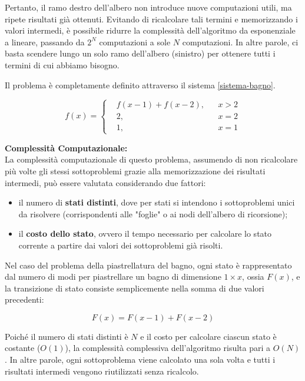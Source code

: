 Pertanto, il ramo destro dell’albero non introduce nuove computazioni utili, ma ripete risultati già ottenuti.  
Evitando di ricalcolare tali termini e memorizzando i valori intermedi, è possibile ridurre la complessità dell’algoritmo da esponenziale a lineare, passando da $2^N$ computazioni a sole $N$ computazioni.
In altre parole, ci basta scendere lungo un solo ramo dell'albero (sinistro) per ottenere tutti i termini di cui abbiamo bisogno.

Il problema è completamente definito attraverso il sistema \eqref{sistema-bagno}.

\begin{equation}
	f(x) =
	\left\{
	\begin{aligned}
		& f(x-1) + f(x-2), && x > 2\\
		& 2, && x = 2\\
		& 1, && x = 1
	\end{aligned}
	\right.
	\label{sistema-bagno}
\end{equation}



\noindent \textbf{Complessità Computazionale:} \\
La complessità computazionale di questo problema, assumendo di non ricalcolare più volte gli stessi sottoproblemi grazie alla memorizzazione dei risultati intermedi, può essere valutata considerando due fattori:


\begin{itemize}
	\item il numero di \textbf{stati distinti}, dove per stati si intendono i sottoproblemi unici da risolvere (corrispondenti alle "foglie" o ai nodi dell'albero di ricorsione);
	\item il \textbf{costo dello stato}, ovvero il tempo necessario per calcolare lo stato corrente a partire dai valori dei sottoproblemi già risolti.
\end{itemize}

Nel caso del problema della piastrellatura del bagno, ogni stato è rappresentato dal numero di modi per piastrellare un bagno di dimensione \(1 \times x\), ossia \(F(x)\), e la transizione di stato consiste semplicemente nella somma di due valori precedenti:

\[
F(x) = F(x-1) + F(x-2)
\]

Poiché il numero di stati distinti è \(N\) e il costo per calcolare ciascun stato è costante (\(O(1)\)), la complessità complessiva dell’algoritmo risulta pari a \(O(N)\).  
In altre parole, ogni sottoproblema viene calcolato una sola volta e tutti i risultati intermedi vengono riutilizzati senza ricalcolo.

